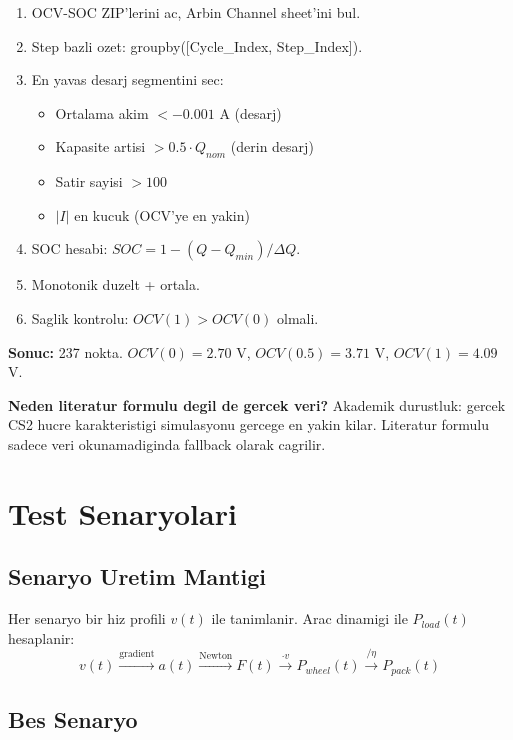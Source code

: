 \documentclass[11pt,a4paper]{article}
\begin{document}
\begin{enumerate}
  \item OCV-SOC ZIP'lerini ac, Arbin Channel sheet'ini bul.
  \item Step bazli ozet: groupby([Cycle\_Index, Step\_Index]).
  \item En yavas desarj segmentini sec:
    \begin{itemize}
      \item Ortalama akim $< -0.001$ A (desarj)
      \item Kapasite artisi $> 0.5 \cdot Q_{nom}$ (derin desarj)
      \item Satir sayisi $> 100$
      \item $|I|$ en kucuk (OCV'ye en yakin)
    \end{itemize}
  \item SOC hesabi: $SOC = 1 - (Q - Q_{min})/\Delta Q$.
  \item Monotonik duzelt + ortala.
  \item Saglik kontrolu: $OCV(1) > OCV(0)$ olmali.
\end{enumerate}

\textbf{Sonuc:} 237 nokta. $OCV(0) = 2.70$ V, $OCV(0.5) = 3.71$ V, $OCV(1) = 4.09$ V.

\begin{whybox}
\textbf{Neden literatur formulu degil de gercek veri?} Akademik durustluk: gercek CS2 hucre karakteristigi simulasyonu gercege en yakin kilar. Literatur formulu sadece veri okunamadiginda fallback olarak cagrilir.
\end{whybox}

\section{Test Senaryolari}

\subsection{Senaryo Uretim Mantigi}

Her senaryo bir hiz profili $v(t)$ ile tanimlanir. Arac dinamigi ile $P_{load}(t)$ hesaplanir:
\[
v(t) \xrightarrow{\text{gradient}} a(t) \xrightarrow{\text{Newton}} F(t) \xrightarrow{\cdot v} P_{wheel}(t) \xrightarrow{/\eta} P_{pack}(t)
\]

\subsection{Bes Senaryo}
\end{document}

